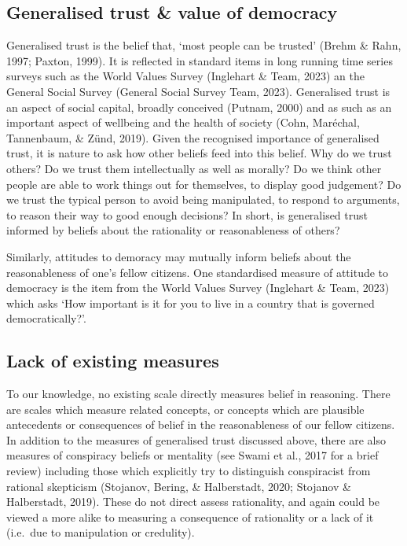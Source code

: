\documentclass[
  ,jou,floatsintext]{apa6}
\begin{document}
\hypertarget{generalised-trust-value-of-democracy}{%
\subsection{Generalised trust \& value of democracy}\label{generalised-trust-value-of-democracy}}

Generalised trust is the belief that, `most people can be trusted' (Brehm \& Rahn, 1997; Paxton, 1999). It is reflected in standard items in long running time series surveys such as the World Values Survey (Inglehart \& Team, 2023) an the General Social Survey (General Social Survey Team, 2023). Generalised trust is an aspect of social capital, broadly conceived (Putnam, 2000) and as such as an important aspect of wellbeing and the health of society (Cohn, Maréchal, Tannenbaum, \& Zünd, 2019). Given the recognised importance of generalised trust, it is nature to ask how other beliefs feed into this belief. Why do we trust others? Do we trust them intellectually as well as morally? Do we think other people are able to work things out for themselves, to display good judgement? Do we trust the typical person to avoid being manipulated, to respond to arguments, to reason their way to good enough decisions? In short, is generalised trust informed by beliefs about the rationality or reasonableness of others?

Similarly, attitudes to demoracy may mutually inform beliefs about the reasonableness of one's fellow citizens. One standardised measure of attitude to democracy is the item from the World Values Survey (Inglehart \& Team, 2023) which asks `How important is it for you to live in a country that is governed democratically?'.

\hypertarget{lack-of-existing-measures}{%
\subsection{Lack of existing measures}\label{lack-of-existing-measures}}

To our knowledge, no existing scale directly measures belief in reasoning. There are scales which measure related concepts, or concepts which are plausible antecedents or consequences of belief in the reasonableness of our fellow citizens. In addition to the measures of generalised trust discussed above, there are also measures of conspiracy beliefs or mentality (see Swami et al., 2017 for a brief review) including those which explicitly try to distinguish conspiracist from rational skepticism (Stojanov, Bering, \& Halberstadt, 2020; Stojanov \& Halberstadt, 2019). These do not direct assess rationality, and again could be viewed a more alike to measuring a consequence of rationality or a lack of it (i.e.~due to manipulation or credulity).
\end{document}
